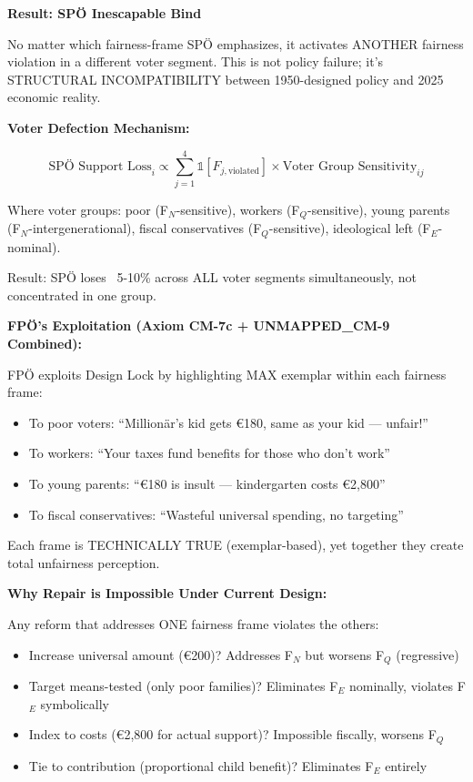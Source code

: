 \textbf{Result: SPÖ Inescapable Bind}

No matter which fairness-frame SPÖ emphasizes, it activates ANOTHER fairness violation in
a different voter segment. This is not policy failure; it's STRUCTURAL INCOMPATIBILITY
between 1950-designed policy and 2025 economic reality.

\textbf{Voter Defection Mechanism:}

\begin{equation}
\text{SPÖ Support Loss}_{i} \propto \sum_{j=1}^{4} \mathbb{1}[F_{j,\text{violated}}] \times
\text{Voter Group Sensitivity}_{ij}
\end{equation}

Where voter groups: poor (F$_N$-sensitive), workers (F$_Q$-sensitive), young parents (F$_N$-intergenerational),
fiscal conservatives (F$_Q$-sensitive), ideological left (F$_E$-nominal).

Result: SPÖ loses ~5-10\% across ALL voter segments simultaneously, not concentrated in one group.

\textbf{FPÖ's Exploitation (Axiom CM-7c + UNMAPPED_CM-9 Combined):}

FPÖ exploits Design Lock by highlighting MAX exemplar within each fairness frame:

\begin{itemize}[nosep]
\item To poor voters: ``Millionär's kid gets €180, same as your kid --- unfair!''
\item To workers: ``Your taxes fund benefits for those who don't work''
\item To young parents: ``€180 is insult --- kindergarten costs €2,800''
\item To fiscal conservatives: ``Wasteful universal spending, no targeting''
\end{itemize}

Each frame is TECHNICALLY TRUE (exemplar-based), yet together they create total
unfairness perception.

\textbf{Why Repair is Impossible Under Current Design:}

Any reform that addresses ONE fairness frame violates the others:

\begin{itemize}[nosep]
\item Increase universal amount (€200)? Addresses F$_N$ but worsens F$_Q$ (regressive)
\item Target means-tested (only poor families)? Eliminates F$_E$ nominally, violates F$_E$ symbolically
\item Index to costs (€2,800 for actual support)? Impossible fiscally, worsens F$_Q$
\item Tie to contribution (proportional child benefit)? Eliminates F$_E$ entirely
\end{itemize}


